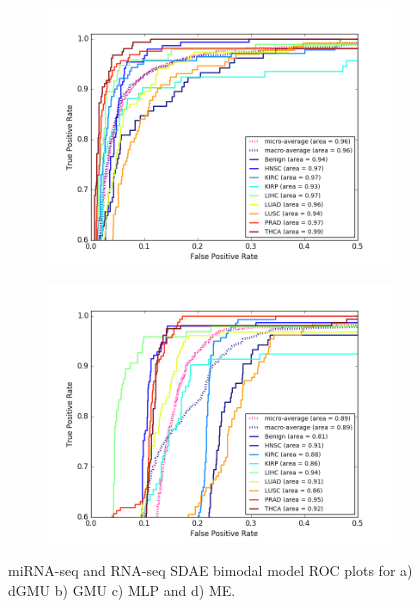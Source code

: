 \begin{figure}[H]
\begin{subfigure}[b]{0.49\textwidth}
         \includegraphics[width=\textwidth]{img/m_r/m_r_sdae_mlp_roc.png}
         \caption{}
     \end{subfigure}
     \begin{subfigure}[b]{0.49\textwidth}
         \centering
         \includegraphics[width=\textwidth]{img/m_r/m_r_sdae_moe_roc.png}
         \caption{}
     \end{subfigure}
        \caption{miRNA-seq and RNA-seq SDAE bimodal model ROC plots for a) dGMU b) GMU c) MLP and d) ME.}
        \label{fig:m_r_sdae_roc}
\end{figure}

